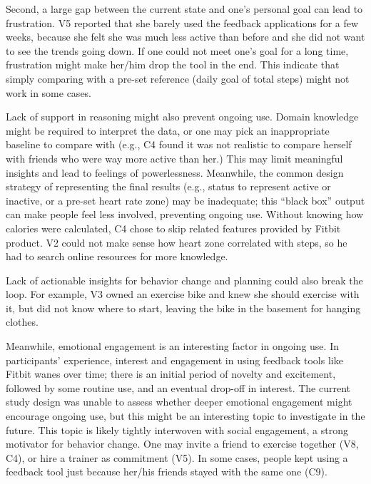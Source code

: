 \documentclass[12pt,oneside]{book}
\begin{document}
Second, a large gap between the current state and one's personal goal can lead to frustration. V5 reported that she barely used the feedback applications for a few weeks, because she felt she was much less active than before and she did not want to see the trends going down. If one could not meet one's goal for a long time, frustration might make her/him drop the tool in the end.
This indicate that simply comparing with a pre-set reference (daily goal of total steps) might not work in some cases.

Lack of support in reasoning might also prevent ongoing use. Domain knowledge might be required to interpret the data, or one may pick an inappropriate baseline to compare with (e.g., C4 found it was not realistic to compare herself with friends who were way more active than her.) This may limit meaningful insights and lead to feelings of powerlessness. Meanwhile, the common design strategy of representing the final results (e.g., status to represent active or inactive, or a pre-set heart rate zone) may be inadequate; this ``black box'' output can make people feel less involved, preventing ongoing use. Without knowing how calories were calculated, C4 chose to skip related features provided by Fitbit product. V2 could not make sense how heart zone correlated with steps, so he had to search online resources for more knowledge. 

Lack of actionable insights for behavior change and planning could also break the loop. For example, V3 owned an exercise bike and knew she should exercise with it, but did not know where to start, leaving the bike in the basement for hanging clothes. 

Meanwhile, emotional engagement is an interesting factor in ongoing use. In participants' experience, interest and engagement in using feedback tools like Fitbit wanes over time; there is an initial period of novelty and excitement, followed by some routine use, and an eventual drop-off in interest. The current study design was unable to assess whether deeper emotional engagement might encourage ongoing use, but this might be an interesting topic to investigate in the future. This topic is likely tightly interwoven with social engagement, a strong motivator for behavior change. One may invite a friend to exercise together (V8, C4), or hire a trainer as commitment (V5). In some cases, people kept using a feedback tool just because her/his friends stayed with the same one (C9).

\end{document}
